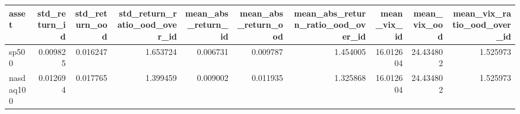 \begin{tabular}{lrrrrrrrrr}
\toprule
asset & std_return_id & std_return_ood & std_return_ratio_ood_over_id & mean_abs_return_id & mean_abs_return_ood & mean_abs_return_ratio_ood_over_id & mean_vix_id & mean_vix_ood & mean_vix_ratio_ood_over_id \\
\midrule
sp500 & 0.009825 & 0.016247 & 1.653724 & 0.006731 & 0.009787 & 1.454005 & 16.012604 & 24.434802 & 1.525973 \\
nasdaq100 & 0.012694 & 0.017765 & 1.399459 & 0.009002 & 0.011935 & 1.325868 & 16.012604 & 24.434802 & 1.525973 \\
\bottomrule
\end{tabular}
